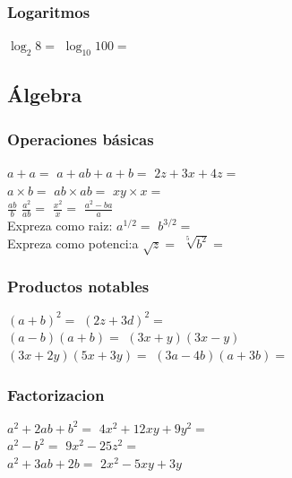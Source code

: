 \documentclass[a4paper,10pt]{article}
\begin{document}
\subsubsection*{Logaritmos}
$\log_2{8}=$\hspace{2cm}
$\log_{10}100=$

\subsection*{Álgebra}

\subsubsection*{Operaciones básicas}
$a+a=$\hspace{2cm} $a+ab+a+b=$ \hspace{2cm} $2z+3x+4z=$
\vspace{1cm}\\
$a\times b=$\hspace{2cm} $ab\times ab=$ \hspace{2cm} $xy\times x = $
\vspace{1cm}\\
$\frac{ab}{b}$ \hspace{2cm} $\frac{a^2}{ab}=$ \hspace{2cm} $\frac{x^2}{x}=$ \hspace$\frac{a^2-ba}{a}$
\vspace{1cm}\\
Expreza como  raiz:  $a^{1/2}=$ \hspace{2cm}$b^{3/2}=$
\vspace{1cm}\\
Expreza como potenci:a $\sqrt{z}=$\hspace{2cm} $\sqrt[5]{b^2}=$
\subsubsection*{Productos notables}
$(a+b)^2=$ \hspace{4cm} $(2z+3d)^2=$ 
\vspace{1cm}\\ 
$(a-b)(a+b)=$ \hspace{4cm} $(3x+y)(3x-y)$
\vspace{1cm}\\
$(3x+2y)(5x+3y)=$ \hspace{4cm} $(3a-4b)(a+3b)=$
\subsubsection*{Factorizacion}
$a^2+2ab+b^2=$ \hspace{4cm} $4x^2+12xy+9y^2=$
\vspace{1cm}\\
$a^2-b^2=$ \haspace{4cm} $9x^2-25z^2=$
\vspace{1cm}\\
$a^2+3ab+2b=$ \hspace{4cm} $2x^2-5xy+3y$
\end{document}
